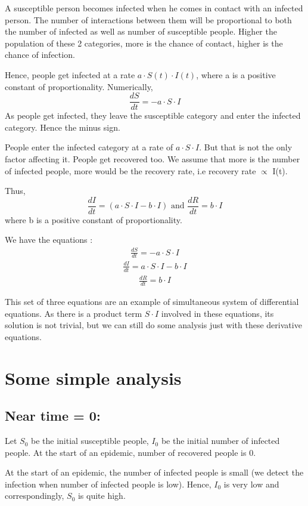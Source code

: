 \documentclass{article}
\begin{document}
A susceptible person becomes infected when he comes in contact with an infected person. The number of interactions between them will be proportional to both the number of infected as well as number of susceptible people. Higher the population of these 2 categories, more is the chance of contact, higher is the chance of infection.

Hence, people get infected at a rate $a\cdot S(t)\cdot I(t)$, where a is a positive constant of proportionality. Numerically, $$\frac{dS}{dt} = -a\cdot S\cdot I$$ As people get infected, they leave the susceptible category and enter the infected category. Hence the minus sign.

People enter the infected category at a rate of $a\cdot S\cdot I$. But that is not the only factor affecting it. People get recovered too. We assume that more is the number of infected people, more would be the recovery rate, i.e recovery rate $\propto$ I(t).

Thus, $$\frac{dI}{dt}=\left(a\cdot S\cdot I - b\cdot I\right)\textrm {  and } \frac{dR}{dt} = b\cdot I$$ where b is a positive constant of proportionality.
\pagebreak

We have the equations :
\begin{align}
    \frac{dS}{dt} = -a\cdot S\cdot I
\end{align}
\begin{align}
    \frac{dI}{dt} = a\cdot S \cdot I - b\cdot I
\end{align}
\begin{align}
    \frac{dR}{dt} = b\cdot I
\end{align}

This set of three equations are an example of simultaneous system of differential equations. As there is a product term $S\cdot I$ involved in these equations, its solution is not trivial, but we can still do some analysis just with these derivative equations.

\section*{Some simple analysis}
\subsection*{Near time = 0:}
Let $S_0$ be the initial susceptible people, $I_0$ be the initial number of infected people. At the start of an epidemic, number of recovered people is 0.

At the start of an epidemic, the number of infected people is small (we detect the infection when number of infected people is low). Hence, $I_0$ is very low and correspondingly, $S_0$ is quite high.
\end{document}

